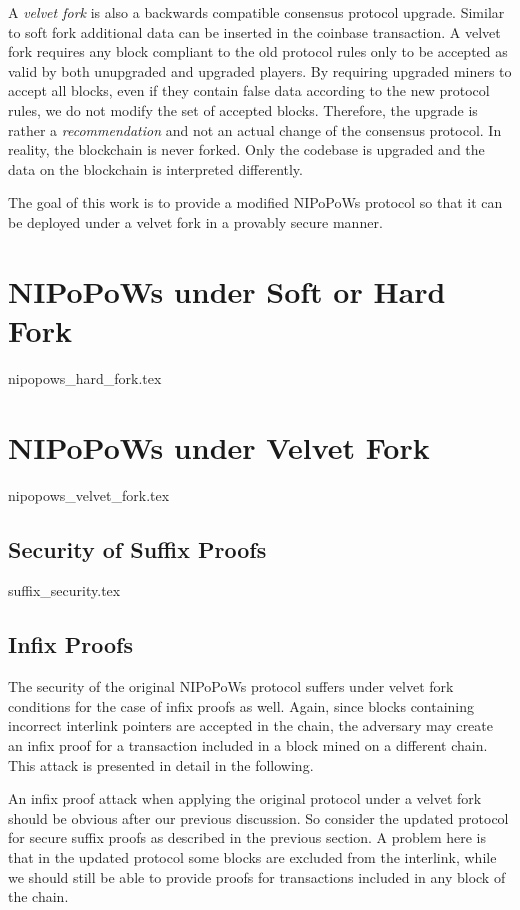 \documentclass[10pt,a4paper]{article}
\theoremstyle{plain}
\theoremstyle{definition}
\theoremstyle{lemma}
\theoremstyle{corollary}
\begin{document}
A \textit{velvet fork} is also a backwards compatible consensus protocol upgrade.
Similar to soft fork additional data can be inserted in the coinbase transaction.
A velvet fork requires any block compliant to the old protocol rules only to be
accepted as valid by both unupgraded and upgraded players. By requiring upgraded
miners to accept all blocks, even if they contain false data according to the new
protocol rules, we do not modify the set of accepted blocks. Therefore, the upgrade
is rather a \textit{recommendation} and not an actual change of the consensus
protocol.  In reality, the blockchain is never forked. Only the codebase is
upgraded and the data on the blockchain is interpreted differently\cite{NIPoPoWs}.


The goal of this work is to provide a modified NIPoPoWs protocol so that it can be
deployed under a velvet fork in a provably secure manner.
\section{NIPoPoWs under Soft or Hard Fork}
{nipopows_hard_fork.tex}

\section{NIPoPoWs under Velvet Fork}
{nipopows_velvet_fork.tex}


\subsection{Security of Suffix Proofs}
{suffix_security.tex}


\subsection{Infix Proofs}
The security of the original NIPoPoWs protocol suffers under velvet fork conditions for the case of
infix proofs as well. Again, since blocks containing incorrect interlink pointers are accepted in the 
chain, the adversary may create an infix proof for a transaction included in a block mined on a
different chain. This attack is presented in detail in the following.

An infix proof attack when applying the original protocol under a velvet fork should be obvious
after our previous discussion. So consider the updated protocol for secure suffix proofs as
described in the previous section. A problem here is that in the updated protocol some blocks
are excluded from the interlink, while we should still be able to provide proofs for transactions
included in any block of the chain.
\end{document}
